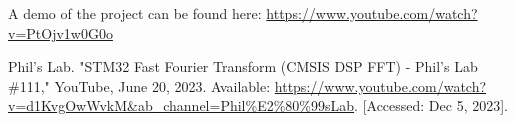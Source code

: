 \documentclass[journal]{IEEEtran}
\begin{document}
\vspace{10pt}
A demo of the project can be found here: \url{https://www.youtube.com/watch?v=PtOjv1w0G0o}

\begin{thebibliography}{9}
Phil's Lab. "STM32 Fast Fourier Transform (CMSIS DSP FFT) - Phil's Lab \#111," YouTube, June 20, 2023.
Available: \url{https://www.youtube.com/watch?v=d1KvgOwWvkM&ab_channel=Phil%E2%80%99sLab}. [Accessed: Dec 5, 2023].
\end{thebibliography}
\end{document}
